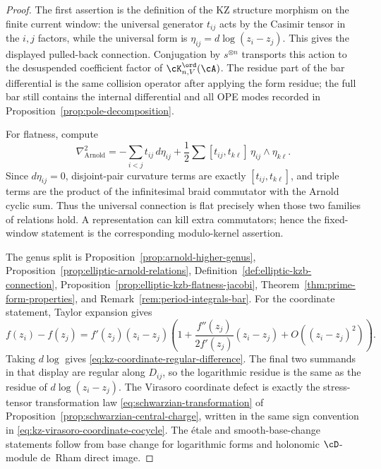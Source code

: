 \begin{proof}
The first assertion is the definition of the KZ structure morphism on
the finite current window: the universal generator $t_{ij}$ acts by the
Casimir tensor in the $i,j$ factors, while the universal form is
$\eta_{ij}=d\log(z_i-z_j)$. This gives the displayed pulled-back
connection. Conjugation by \(s^{\otimes n}\) transports this action to
the desuspended coefficient factor of \(\cK^{\ord}_{n,V}(\cA)\). The
residue part of the bar differential is the same collision operator
after applying the form residue; the full bar still contains the
internal differential and all OPE modes recorded in
Proposition~\ref{prop:pole-decomposition}.

For flatness, compute
\[
\nabla_{\mathrm{Arnold}}^2
=-\sum_{i<j}t_{ij}\,d\eta_{ij}
+\frac12\sum [t_{ij},t_{k\ell}]\,\eta_{ij}\wedge\eta_{k\ell}.
\]
Since $d\eta_{ij}=0$, disjoint-pair curvature terms are exactly
$[t_{ij},t_{k\ell}]$, and triple terms are the product of the
infinitesimal braid commutator with the Arnold cyclic sum. Thus the
universal connection is flat precisely when those two families of
relations hold. A representation can kill extra commutators; hence the
fixed-window statement is the corresponding modulo-kernel assertion.

The genus split is Proposition~\ref{prop:arnold-higher-genus},
Proposition~\ref{prop:elliptic-arnold-relations},
Definition~\ref{def:elliptic-kzb-connection},
Proposition~\ref{prop:elliptic-kzb-flatness-jacobi},
Theorem~\ref{thm:prime-form-properties}, and
Remark~\ref{rem:period-integrals-bar}. For the coordinate statement,
Taylor expansion gives
\[
f(z_i)-f(z_j)
=f'(z_j)(z_i-z_j)
\left(1+\frac{f''(z_j)}{2f'(z_j)}(z_i-z_j)
  +O((z_i-z_j)^2)\right).
\]
Taking \(d\log\) gives
\eqref{eq:kz-coordinate-regular-difference}. The final two summands in
that display are regular along \(D_{ij}\), so the logarithmic residue
is the same as the residue of \(d\log(z_i-z_j)\). The Virasoro
coordinate defect is exactly the stress-tensor transformation law
\eqref{eq:schwarzian-transformation} of
Proposition~\ref{prop:schwarzian-central-charge}, written in the same
sign convention in \eqref{eq:kz-virasoro-coordinate-cocycle}. The
\'{e}tale and smooth-base-change statements follow from base change for
logarithmic forms and holonomic $\cD$-module de~Rham direct image.
\end{proof}

